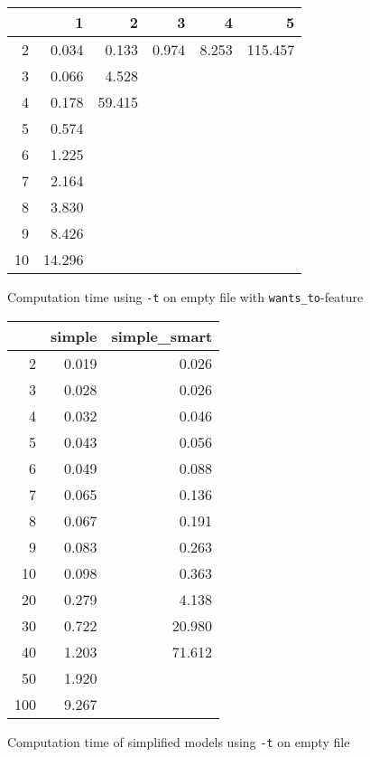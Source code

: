 \documentclass[a4paper,10pt]{article}
\begin{document}
	\begin{figure}[H]
		\begin{center}
			\begin{tabular}{r|r|r|r|r|r}
				\backslashbox{$F$}{$n$} & 1 & 2 & 3 & 4 & 5 \\ \hline
				2	& 0.034		& 0.133		& 0.974		& 8.253		& 115.457	\\ \hline
				3	& 0.066		& 4.528		& 			& 			&			\\ \hline
				4	& 0.178		& 59.415	& 			&			&			\\ \hline
				5	& 0.574		&			&			&			&			\\ \hline
				6	& 1.225		&			&			&			&			\\ \hline 
				7	& 2.164		&			&			&			&			\\ \hline
				8	& 3.830		&			&			&			&			\\ \hline
				9	& 8.426		&			&			&			&			\\ \hline
				10	& 14.296	&			&			&			&			\\ \hline
			\end{tabular}
		\end{center}
		
		\caption{Computation time using \texttt{-t} on empty file with \texttt{wants\_to}-feature}
	\end{figure}
	
	\begin{figure}[H]
		\begin{center}
			\begin{tabular}{r|r|r}
				\backslashbox{$F$}{$n$} & simple & simple\_smart \\ \hline
				2	& 0.019		& 0.026		\\ \hline
				3	& 0.028		& 0.026		\\ \hline
				4	& 0.032		& 0.046		\\ \hline
				5	& 0.043		& 0.056		\\ \hline
				6	& 0.049		& 0.088		\\ \hline 
				7	& 0.065		& 0.136		\\ \hline
				8	& 0.067		& 0.191		\\ \hline
				9	& 0.083		& 0.263		\\ \hline
				10	& 0.098		& 0.363		\\ \hline
				20	& 0.279		& 4.138		\\ \hline
				30	& 0.722		& 20.980	\\ \hline
				40	& 1.203		& 71.612	\\ \hline
				50	& 1.920		&		\\ \hline
				100	& 9.267		&		\\ \hline
			\end{tabular}
		\end{center}
		
		\caption{Computation time of simplified models using \texttt{-t} on empty file}

	\end{figure}
	
\end{document}

